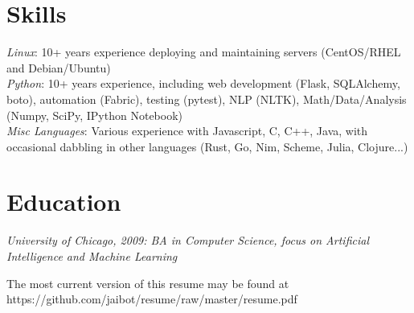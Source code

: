 \documentclass[line]{res} %
\begin{document}
\begin{resume}
\section{Skills}
{\sl Linux}: 10+ years experience deploying and maintaining servers (CentOS/RHEL and Debian/Ubuntu)\\
{\sl Python}: 10+ years experience, including web development (Flask, SQLAlchemy, boto), automation (Fabric), testing (pytest), NLP (NLTK), Math/Data/Analysis (Numpy, SciPy, IPython Notebook) \\
{\sl Misc Languages}: Various experience with Javascript, C, C++, Java, with occasional dabbling in other languages (Rust, Go, Nim, Scheme, Julia, Clojure...)


\section{Education}

{\sl University of Chicago, 2009: BA in Computer Science, focus on Artificial Intelligence and Machine Learning}
 
\hspace{-10mm}
The most current version of this resume may be found at https://github.com/jaibot/resume/raw/master/resume.pdf
\end{resume}
\end{document}
